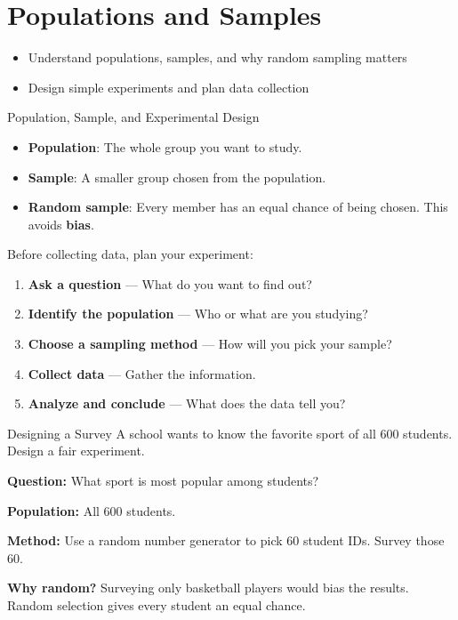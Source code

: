 \section{Populations and Samples}

\begin{learningGoals}
\begin{itemize}
    \item Understand populations, samples, and why random sampling matters
    \item Design simple experiments and plan data collection
\end{itemize}
\end{learningGoals}

\begin{conceptBox}{Population, Sample, and Experimental Design}
\begin{itemize}[leftmargin=*]
    \item \textbf{Population}: The whole group you want to study.
    \item \textbf{Sample}: A smaller group chosen from the population.
    \item \textbf{Random sample}: Every member has an equal chance of being chosen. This avoids \textbf{bias}.
\end{itemize}
Before collecting data, plan your experiment:
\begin{enumerate}[leftmargin=*]
    \item \textbf{Ask a question} — What do you want to find out?
    \item \textbf{Identify the population} — Who or what are you studying?
    \item \textbf{Choose a sampling method} — How will you pick your sample?
    \item \textbf{Collect data} — Gather the information.
    \item \textbf{Analyze and conclude} — What does the data tell you?
\end{enumerate}
\end{conceptBox}

\begin{workedExample}{Designing a Survey}
A school wants to know the favorite sport of all $600$ students. Design a fair experiment.

\textbf{Question:} What sport is most popular among students?

\textbf{Population:} All $600$ students.

\textbf{Method:} Use a random number generator to pick $60$ student IDs. Survey those $60$.

\textbf{Why random?} Surveying only basketball players would bias the results. Random selection gives every student an equal chance.
\end{workedExample}

